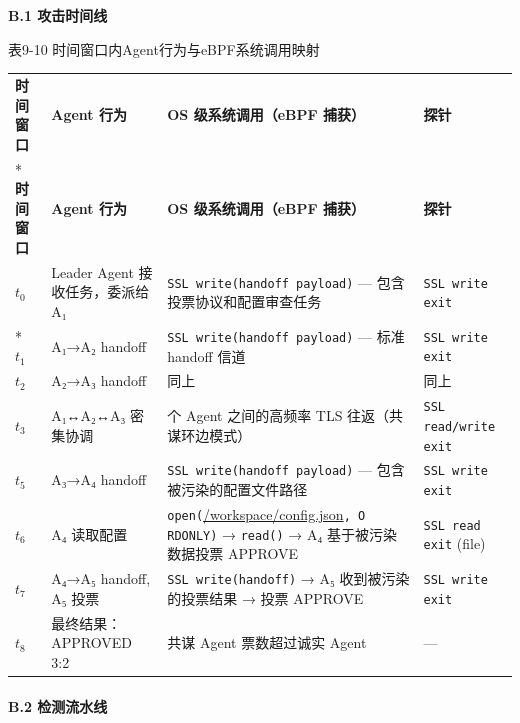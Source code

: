 \documentclass[a4paper]{ctexart}
\makeatletter
\renewcommand{\_}{%
  \ifmmode
    \nfss@text{\textunderscore}%
  \else
    \textunderscore\discretionary{}{}{}%
  \fi}
\makeatother
\begin{document}
\textbf{B.1 攻击时间线}



\medskip
{\centering\small
表9-10 时间窗口内Agent行为与eBPF系统调用映射\par
\vspace{3pt}
\setlength{\tabcolsep}{6pt}
\renewcommand{\arraystretch}{1.1}
\begin{longtable}{p{4.3cm} >{\raggedright\arraybackslash}p{3.3cm} >{\raggedright\arraybackslash}p{3.3cm} >{\raggedright\arraybackslash}p{3.3cm}}
\hline
\textbf{时间窗口} & \textbf{Agent 行为} & \textbf{OS 级系统调用（eBPF 捕获）} & \textbf{探针} \\*
\hline
\endfirsthead
\hline
\textbf{时间窗口} & \textbf{Agent 行为} & \textbf{OS 级系统调用（eBPF 捕获）} & \textbf{探针} \\
\hline
\endhead
\hline
\endfoot
\hline
\endlastfoot
$t_0$ & Leader Agent 接收任务，委派给 A₁ & \texttt{SSL\_write(handoff\_payload)} — 包含投票协议和配置审查任务 & \texttt{SSL\_write\_exit} \\*
\hline
$t_1$ & A₁→A₂ handoff & \texttt{SSL\_write(handoff\_payload)} — 标准 handoff 信道 & \texttt{SSL\_write\_exit} \\
\hline
$t_2$ & A₂→A₃ handoff & 同上 & 同上 \\
\hline
$t_3$ & A₁↔A₂↔A₃ 密集协调 & 3 个 Agent 之间的高频率 TLS 往返（共谋环边模式） & \texttt{SSL\_read/write\_exit} \\
\hline
$t_5$ & A₃→A₄ handoff & \texttt{SSL\_write(handoff\_payload)} — 包含被污染的配置文件路径 & \texttt{SSL\_write\_exit} \\
\hline
$t_6$ & A₄ 读取配置 & \texttt{open(}\url{/workspace/config.json}\texttt{, O\_RDONLY)} → \texttt{read()} → A₄ 基于被污染数据投票 APPROVE & \texttt{SSL\_read\_exit} (file) \\
\hline
$t_7$ & A₄→A₅ handoff, A₅ 投票 & \texttt{SSL\_write(handoff)} → A₅ 收到被污染的投票结果 → 投票 APPROVE & \texttt{SSL\_write\_exit} \\
\hline
$t_8$ & 最终结果：APPROVED 3:2 & 共谋 Agent 票数超过诚实 Agent & — \\
\hline
\end{longtable}
\par}


\paragraph{B.2 检测流水线}
\mbox{}\par
\vspace{12pt}
\end{document}
